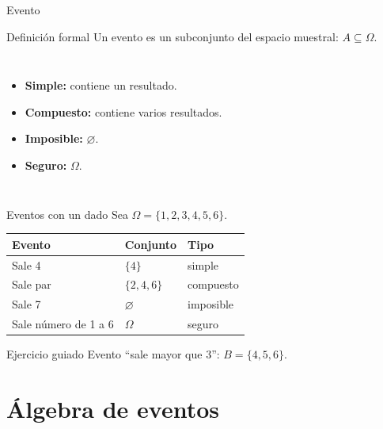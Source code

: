 \documentclass[aspectratio=169,11pt]{beamer}
\begin{document}
\begin{frame}{Evento}
\begin{block}{Definición formal}
Un evento es un subconjunto del espacio muestral: $A\subseteq\Omega$.
\end{block}
\begin{columns}[T]
\begin{itemize}
  \item \textbf{Simple:} contiene un resultado.
  \item \textbf{Compuesto:} contiene varios resultados.
  \item \textbf{Imposible:} $\varnothing$.
  \item \textbf{Seguro:} $\Omega$.
\end{itemize}
\end{columns}
\end{frame}

\begin{frame}{Eventos con un dado}
\small
Sea $\Omega=\{1,2,3,4,5,6\}$.
\begin{center}
\begin{tabular}{p{}p{}p{}}
\toprule
Evento & Conjunto & Tipo \\
\midrule
Sale 4 & $\{4\}$ & simple \\
Sale par & $\{2,4,6\}$ & compuesto \\
Sale 7 & $\varnothing$ & imposible \\
Sale número de 1 a 6 & $\Omega$ & seguro \\
\bottomrule
\end{tabular}
\end{center}
\begin{exampleblock}{Ejercicio guiado}
Evento ``sale mayor que 3'': \pause $B=\{4,5,6\}$.
\end{exampleblock}
\end{frame}

\section{Álgebra de eventos}
\end{document}
